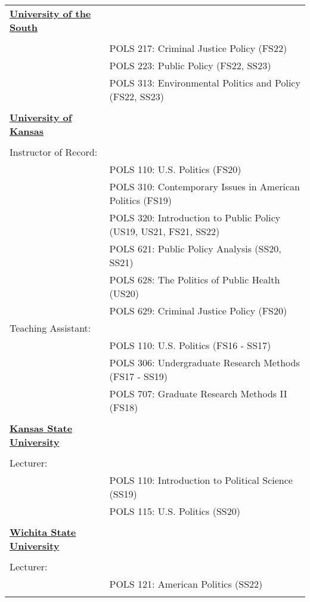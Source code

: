\documentclass[margin,line,pifont,palatino,courier]{res}
\begin{document}
\begin{resume}
\begin{tabular}{ll}
    \textbf{\underline{University of the South}} & \tabularnewline
  & \tabularnewline
  & POLS 217: Criminal Justice Policy (FS22)\tabularnewline
  & POLS 223: Public Policy (FS22, SS23)\tabularnewline
  & POLS 313: Environmental Politics and Policy (FS22, SS23)\tabularnewline
  & \tabularnewline
  \textbf{\underline{University of Kansas}} & \tabularnewline
  & \tabularnewline
    Instructor of Record: & \tabularnewline
  & POLS 110: U.S. Politics (FS20)\tabularnewline
  & POLS 310: Contemporary Issues in American Politics (FS19)\tabularnewline
  & POLS 320: Introduction to Public Policy (US19, US21, FS21, SS22)\tabularnewline
  & POLS 621: Public Policy Analysis (SS20, SS21)\tabularnewline
  & POLS 628: The Politics of Public Health (US20)\tabularnewline
  & POLS 629: Criminal Justice Policy (FS20)\tabularnewline
    Teaching Assistant: & \tabularnewline
  & POLS 110: U.S. Politics (FS16 - SS17)\tabularnewline
  & POLS 306: Undergraduate Research Methods (FS17 - SS19)\tabularnewline
  & POLS 707: Graduate Research Methods II (FS18)\tabularnewline
  & \tabularnewline
    \textbf{\underline{Kansas State University}} & \tabularnewline
  & \tabularnewline
    Lecturer: & \tabularnewline
  & POLS 110: Introduction to Political Science (SS19)\tabularnewline
  & POLS 115: U.S. Politics (SS20)\tabularnewline
  & \tabularnewline
    \textbf{\underline{Wichita State University}} & \tabularnewline
  & \tabularnewline
    Lecturer: & \tabularnewline
  & POLS 121: American Politics (SS22)\tabularnewline
  & \tabularnewline
\end{tabular}



\end{resume}
\end{document}
